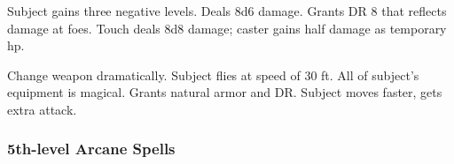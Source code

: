 \begin{swspelllist}
   Subject gains three negative levels.
   Deals 8d6 damage.
   Grants DR 8 that reflects damage at foes.
   Touch deals 8d8 damage; caster gains half damage as temporary hp.

   Change weapon dramatically.
   Subject flies at speed of 30 ft.
   All of subject's equipment is magical.
   Grants natural armor and DR.
   Subject moves faster, gets extra attack.
\end{swspelllist}

\subsubsection{5th-level Arcane Spells} 
